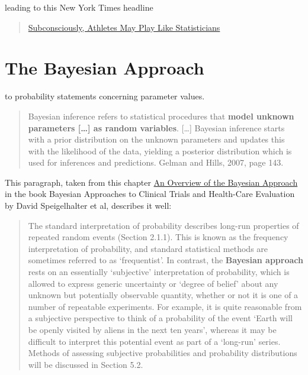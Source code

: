 \documentclass[]{book}
\begin{document}
leading to this New York Times headline

\begin{quote}
\href{http://www.medicine.mcgill.ca/epidemiology/hanley/bios601/ch10Bayes/AthletesStatisticians.pdf}{Subconsciously, Athletes May Play Like Statisticians}
\end{quote}

\hypertarget{the-bayesian-approach}{%
\section{The Bayesian Approach}\label{the-bayesian-approach}}

to probability statements concerning parameter values.

\begin{quote}
Bayesian inference refers to statistical procedures that \textbf{model unknown parameters {[}\ldots{}{]} as random variables}. {[}\ldots{}{]} Bayesian inference starts with a prior distribution on the unknown parameters and updates this with the likelihood of the data, yielding a posterior distribution which is used for inferences and predictions. Gelman and Hills, 2007, page 143.
\end{quote}

This paragraph, taken from this chapter
\href{http://www.medicine.mcgill.ca/epidemiology/hanley/bios601/ch10Bayes/an\%20overview\%20of\%20the\%20Bayesian\%20approach.pdf}{An Overview of the Bayesian Approach}
in the book Bayesian Approaches to Clinical Trials and Health-Care Evaluation by David Speigelhalter et al, describes it well:

\begin{quote}
The standard interpretation of probability describes long-run properties of repeated random events (Section 2.1.1). This is known as the frequency interpretation of probability, and standard statistical methods are sometimes referred to as `frequentist'. In contrast, the \textbf{Bayesian approach} rests on an essentially `subjective' interpretation of probability, which is allowed to express generic uncertainty or `degree of belief' about any unknown but potentially observable quantity, whether or not it is one of a number of repeatable experiments. For example, it is quite reasonable from a subjective perspective to think of a probability of the event `Earth will be openly visited by aliens in the next ten years', whereas it may be difficult to interpret this potential event as part of a `long-run' series. Methods of assessing subjective probabilities and probability distributions will be discussed in Section 5.2.
\end{quote}
\end{document}
